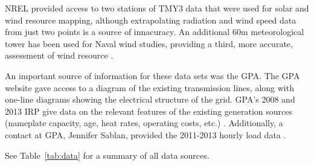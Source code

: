 \documentclass[12pt,letterpaper,fleqn]{article}
\begin{document}
NREL provided access to two stations of TMY3 data that were used for
solar and wind resource mapping, although extrapolating radiation and
wind speed data from just two points is a source of innacuracy. An
additional 60m meteorological tower has been used for Naval wind
studies, providing a third, more accurate, assessment of wind resource
\cite{nrel09}. 

An important source of information for these data sets was the GPA. The GPA website gave access to a diagram of the
existing transmission lines, along with one-line diagrams showing the
electrical structure of the grid. GPA's 2008 and 2013 IRP give data on the
relevant features of the existing generation sources (nameplate
capacity, age, heat rates, operating costs, etc.) \cite{cruz08, cruz13}. Additionally, a
contact at GPA, Jennifer Sablan, provided the 2011-2013 hourly load
data \cite{sablan}.

See Table~\ref{tab:data} for a summary of all data sources.
\end{document}
